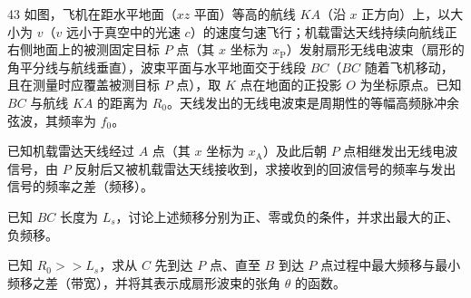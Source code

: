 \begin{problem}[第32届全国中学生物理竞赛复赛][多普勒频移]{43}
    如图，飞机在距水平地面（$xz$ 平面）等高的航线 $KA$（沿 $x$ 正方向）上，以大小为 $v$（$v$ 远小于真空中的光速 $c$）的速度匀速飞行；机载雷达天线持续向航线正右侧地面上的被测固定目标 $P$ 点（其 $x$ 坐标为 $x_{\mathrm{P}}$）发射扇形无线电波束（扇形的角平分线与航线垂直），波束平面与水平地面交于线段 $BC$（$BC$ 随着飞机移动，且在测量时应覆盖被测目标 $P$ 点），取 $K$ 点在地面的正投影 $O$ 为坐标原点。已知 $BC$ 与航线 $KA$ 的距离为 $R_{0}$。天线发出的无线电波束是周期性的等幅高频脉冲余弦波，其频率为 $f_{0}$。
    \begin{subproblem}
        已知机载雷达天线经过 $A$ 点（其 $x$ 坐标为 $x_{\mathrm{A}}$）及此后朝 $P$ 点相继发出无线电波信号，由 $P$ 反射后又被机载雷达天线接收到，求接收到的回波信号的频率与发出信号的频率之差（频移）。
    \end{subproblem}
    \begin{subproblem}
        已知 $BC$ 长度为 $L_{s}$，讨论上述频移分别为正、零或负的条件，并求出最大的正、负频移。
    \end{subproblem}
    \begin{subproblem}
        已知 $R_{0} >> L_{s}$，求从 $C$ 先到达 $P$ 点、直至 $B$ 到达 $P$ 点过程中最大频移与最小频移之差（带宽），并将其表示成扇形波束的张角 $\theta$ 的函数。
    \end{subproblem}
\end{problem}